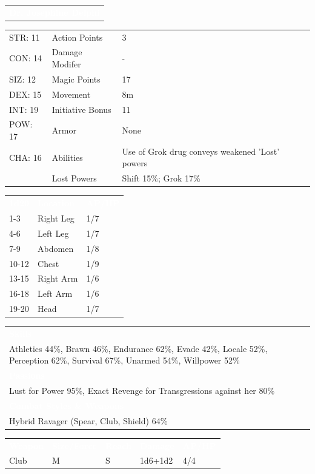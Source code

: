 \documentclass[letterpaper,serif]{rpg-module}
\begin{document}
\noindent\begin{tabularx}{\linewidth}{X}
\rowcolor{gray}
\textcolor{white}{\textbf{Dr. Josephine  Delphi}}
\end{tabularx}
\begin{tabularx}{\linewidth}{XXX}
STR: 11 & Action Points & 3 \\
CON: 14 & Damage Modifer & - \\
SIZ: 12 & Magic Points & 17 \\
DEX: 15 & Movement & 8m \\
INT: 19 & Initiative Bonus & 11 \\
POW: 17 & Armor & None \\
CHA: 16 & Abilities & Use of Grok drug conveys weakened 'Lost' powers  \\
    & Lost Powers & Shift 15\%; Grok 17\%
\end{tabularx}
\begin{tabularx}{\linewidth}{XXX}
\rowcolor{gray}
\textcolor{white}{\textbf{1d20}} & \textcolor{white}{\textbf{Location}} & \textcolor{white}{\textbf{AP/HP}} \\
1-3 & Right Leg & 1/7 \\
4-6 & Left Leg & 1/7 \\
7-9 & Abdomen & 1/8 \\
10-12 & Chest & 1/9 \\
13-15 & Right Arm & 1/6 \\
16-18 & Left Arm & 1/6 \\
19-20 & Head & 1/7 
\end{tabularx}
\begin{tabularx}{\linewidth}{X}
\rowcolor{gray}
\textcolor{white}{\textbf{Skills}} \\
Athletics 44\%, Brawn 46\%, Endurance 62\%, Evade 42\%, Locale 52\%, Perception 62\%, Survival 67\%, Unarmed 54\%, Willpower 52\%\\
\rowcolor{gray}
\textcolor{white}{\textbf{Passions}} \\
Lust for Power 95\%, Exact Revenge for Transgressions against her 80\% \\
\rowcolor{gray}
\textcolor{white}{\textbf{Combat Styles \& Weapons}} \\
Hybrid Ravager (Spear, Club, Shield) 64\%
\end{tabularx}
\begin{tabularx}{\linewidth}{XXXXX}
\rowcolor{gray}
\textcolor{white}{\textbf{Weapon}} & \textcolor{white}{\textbf{Size/Force}} & \textcolor{white}{\textbf{Reach}} & \textcolor{white}{\textbf{Damage}} & \textcolor{white}{\textbf{AP/HP}} \\
Club & M & S & 1d6+1d2 & 4/4
\end{tabularx}
\end{document}
